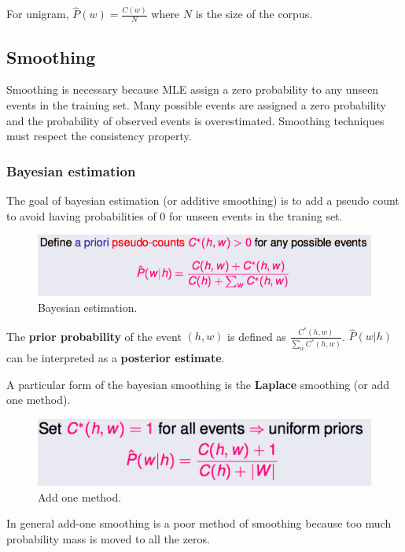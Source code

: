 For unigram, $\hat{P}(w) = \frac{C(w)}{N}$ where $N$ is the size of the corpus.

\subsection{Smoothing}

Smoothing is necessary because MLE assign a zero probability to any unseen events in the training set. Many possible events are assigned a zero probability and the probability of observed events is overestimated. Smoothing techniques must respect the consistency property.

\subsubsection{Bayesian estimation}

The goal of bayesian estimation (or additive smoothing) is to add a pseudo count to avoid having probabilities of 0 for unseen events in the traning set.

\begin{figure}[htp]
	\centering
	\includegraphics[scale=0.5]{images/13_bayesian.png}
 	\caption{Bayesian estimation.}
\end{figure}

The \textbf{prior probability} of the event $(h,w)$ is defined as $\frac{C^*(h,w)}{\sum_w C^*(h,w)}$. $\hat{P}(w|h)$ can be interpreted as a \textbf{posterior estimate}.

A particular form of the bayesian smoothing is the \textbf{Laplace} smoothing (or add one method).

\begin{figure}[htp]
	\centering
	\includegraphics[scale=0.5]{images/14_add_one.png}
 	\caption{Add one method.}
\end{figure}

In general add-one smoothing is a poor method of smoothing because too much probability mass is moved to all the zeros.


